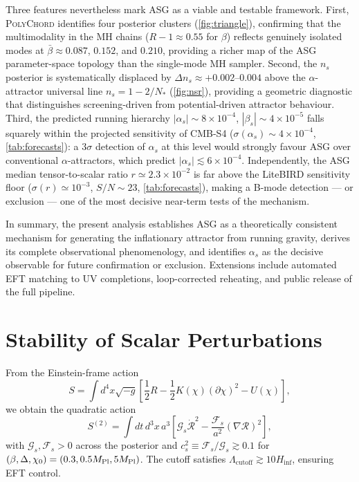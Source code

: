 \documentclass[11pt,a4paper]{article}
\begin{document}
Three features nevertheless mark ASG as a viable and testable framework. First, \textsc{PolyChord} identifies four posterior clusters (\cref{fig:triangle}), confirming that the multimodality in the MH chains ($R{-}1\approx0.55$ for $\beta$) reflects genuinely isolated modes at $\bar\beta\approx0.087$, $0.152$, and $0.210$, providing a richer map of the ASG parameter-space topology than the single-mode MH sampler. Second, the $n_s$ posterior is systematically displaced by $\Delta n_s\approx+0.002$--$0.004$ above the $\alpha$-attractor universal line $n_s=1-2/N_*$ (\cref{fig:nsr}), providing a geometric diagnostic that distinguishes screening-driven from potential-driven attractor behaviour. Third, the predicted running hierarchy $|\alpha_s|\sim8\times10^{-4}$, $|\beta_s|\sim4\times10^{-5}$ falls squarely within the projected sensitivity of CMB-S4 ($\sigma(\alpha_s)\sim4\times10^{-4}$, \cref{tab:forecasts}): a $3\sigma$ detection of $\alpha_s$ at this level would strongly favour ASG over conventional $\alpha$-attractors, which predict $|\alpha_s|\lesssim6\times10^{-4}$. Independently, the ASG median tensor-to-scalar ratio $r\simeq2.3\times10^{-2}$ is far above the LiteBIRD sensitivity floor ($\sigma(r)\simeq10^{-3}$, $S/N\sim23$, \cref{tab:forecasts}), making a B-mode detection --- or exclusion --- one of the most decisive near-term tests of the mechanism.

In summary, the present analysis establishes ASG as a theoretically consistent mechanism for generating the inflationary attractor from running gravity, derives its complete observational phenomenology, and identifies $\alpha_s$ as the decisive observable for future confirmation or exclusion. Extensions include automated EFT matching to UV completions, loop-corrected reheating, and public release of the full pipeline.

\section{Stability of Scalar Perturbations}
\label{sec:stability}
From the Einstein-frame action
\begin{equation}
S=\int d^{4}x\sqrt{-g}\left[\frac{1}{2}R-\frac{1}{2}K(\chi)(\partial\chi)^{2}-U(\chi)\right],
\end{equation}
we obtain the quadratic action
\begin{equation}
S^{(2)}=\int dt\,d^{3}x\,a^{3}\left[\mathcal{G}_{s}\dot{\mathcal{R}}^{2}-\frac{\mathcal{F}_{s}}{a^{2}}(\nabla\mathcal{R})^{2}\right],
\end{equation}
with $\mathcal{G}_{s},\mathcal{F}_{s}>0$ across the posterior and $c_{s}^{2}\equiv\mathcal{F}_{s}/\mathcal{G}_{s}\gtrsim0.1$ for $(\beta,\Delta,\chi_{0})=(0.3,0.5M_{\rm Pl},5M_{\rm Pl})$. The cutoff satisfies $\Lambda_{\text{cutoff}}\gtrsim10H_{\text{inf}}$, ensuring EFT control.
\end{document}
